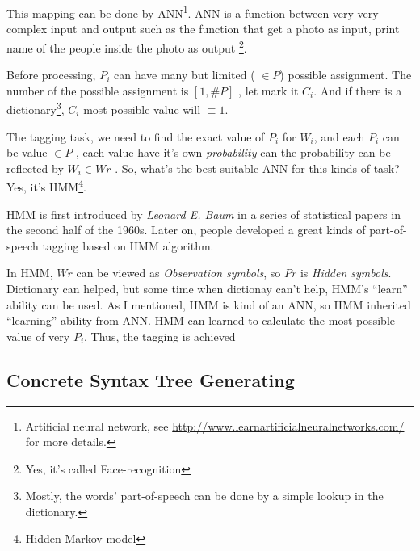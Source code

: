 This mapping can be done by ANN\footnote{Artificial neural network, see \url{http://www.learnartificialneuralnetworks.com/} for more details. }.
ANN is a function between very very complex input and output such as the function that get a photo as input, print name of the people inside the photo as output \footnote{Yes, it's called Face-recognition}.

Before processing, $P_i$ can have many but limited ( $\in P$) possible  assignment. The number of the possible assignment is $[1, \#P ] $ , let mark it $ C_i $. 
And if there is a dictionary\footnote{Mostly, the words' part-of-speech can be done by a simple lookup in the dictionary.}, $ C_i $ most possible value will $ \equiv 1 $. 

The tagging task, we need to find the exact value of $P_i$ for $W_i$, and each $P_i$ can be value $ \in P $ ,  each value have it's own \emph{probability} can the probability can be reflected by $ W_i \in Wr $ . So, what's the best suitable ANN for this kinds of task? Yes, it's HMM\footnote{Hidden Markov model}{\citep{HMM_Based_Part_Of_Speech_Tagging}}.

HMM is first introduced by \emph{Leonard E. Baum} in a series of statistical papers in the second half of the 1960s. Later on, people developed a great kinds of part-of-speech tagging based on HMM algorithm. 

In HMM, $ Wr $ can be viewed as \emph{Observation symbols}, so $Pr$ is \emph{Hidden symbols}. Dictionary can helped, but some time when dictionay can't help, HMM's ``learn'' ability  can be used. As I mentioned, HMM is kind of an ANN, so HMM inherited ``learning'' ability from ANN.
HMM can learned to calculate the most possible value of very $P_i$. Thus, the tagging is achieved

\subsection{Concrete Syntax Tree Generating}

